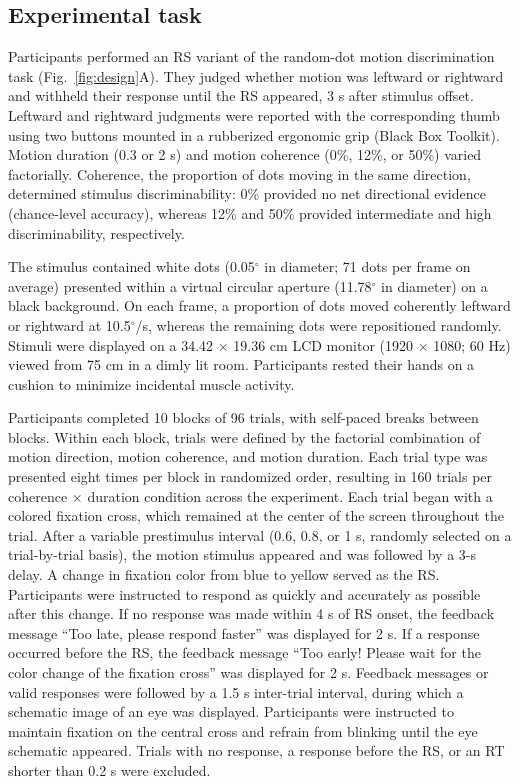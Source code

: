 \documentclass[a4paper,11pt]{article}
\theoremstyle{definition}
\newcommand{\1}{\mathbbm{1}}
\begin{document}
\subsection{Experimental task}

Participants performed an RS variant of the random-dot motion discrimination task (Fig.~\ref{fig:design}A). They judged whether motion was leftward or rightward and withheld their response until the RS appeared, 3 s after stimulus offset. Leftward and rightward judgments were reported with the corresponding thumb using two buttons mounted in a rubberized ergonomic grip (Black Box Toolkit). Motion duration (0.3 or 2 s) and motion coherence (0\%, 12\%, or 50\%) varied factorially. Coherence, the proportion of dots moving in the same direction, determined stimulus discriminability: 0\% provided no net directional evidence (chance-level accuracy), whereas 12\% and 50\% provided intermediate and high discriminability, respectively.

The stimulus contained white dots (0.05$^{\circ}$ in diameter; 71 dots per frame on average) presented within a virtual circular aperture (11.78$^{\circ}$ in diameter) on a black background. On each frame, a proportion of dots moved coherently leftward or rightward at 10.5$^{\circ}$/s, whereas the remaining dots were repositioned randomly. Stimuli were displayed on a 34.42 $\times$ 19.36 cm LCD monitor (1920 $\times$ 1080; 60 Hz) viewed from 75 cm in a dimly lit room. Participants rested their hands on a cushion to minimize incidental muscle activity.

Participants completed 10 blocks of 96 trials, with self-paced breaks between blocks. Within each block, trials were defined by the factorial combination of motion direction, motion coherence, and motion duration. Each trial type was presented eight times per block in randomized order, resulting in 160 trials per coherence $\times$ duration condition across the experiment. Each trial began with a colored fixation cross, which remained at the center of the screen throughout the trial. After a variable prestimulus interval (0.6, 0.8, or 1 s, randomly selected on a trial-by-trial basis), the motion stimulus appeared and was followed by a 3-s delay. A change in fixation color from blue to yellow served as the RS. Participants were instructed to respond as quickly and accurately as possible after this change. If no response was made within 4 s of RS onset, the feedback message ``Too late, please respond faster'' was displayed for 2 s. If a response occurred before the RS, the feedback message ``Too early! Please wait for the color change of the fixation cross'' was displayed for 2 s. Feedback messages or valid responses were followed by a 1.5 s inter-trial interval, during which a schematic image of an eye was displayed. Participants were instructed to maintain fixation on the central cross and refrain from blinking until the eye schematic appeared. Trials with no response, a response before the RS, or an RT shorter than 0.2 s were excluded.
\end{document}

